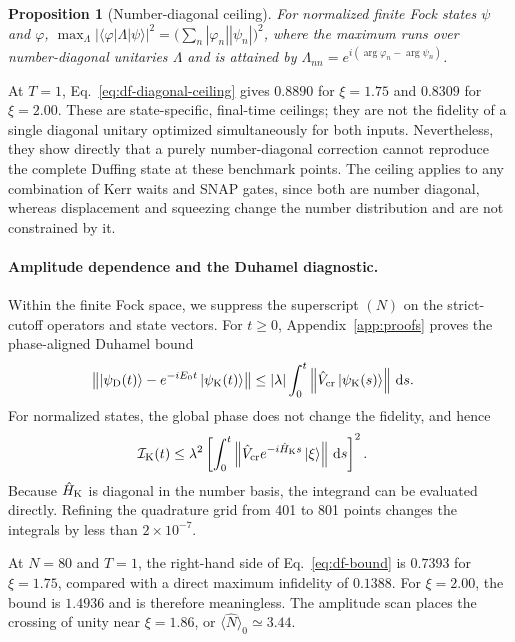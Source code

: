 \documentclass[pra,twocolumn,superscriptaddress,nofootinbib,floatfix]{revtex4-2}
\newtheorem{proposition}{Proposition}
\theoremstyle{remark}
\begin{document}
\begin{proposition}[Number-diagonal ceiling]
\label{prop:diagonal}
For normalized finite Fock states \(\psi\) and \(\varphi\), \(\max_{\Lambda}|\langle\varphi|\Lambda|\psi\rangle|^2=\bigl(\sum_n|\varphi_n||\psi_n|\bigr)^2\), where the maximum runs over number-diagonal unitaries \(\Lambda\) and is attained by \(\Lambda_{nn}=e^{i(\arg\varphi_n-\arg\psi_n)}\).
\end{proposition}

At \(T=1\), Eq.~\eqref{eq:df-diagonal-ceiling} gives \(0.8890\) for \(\xi=1.75\) and \(0.8309\) for \(\xi=2.00\). These are state-specific, final-time ceilings; they are not the fidelity of a single diagonal unitary optimized simultaneously for both inputs. Nevertheless, they show directly that a purely number-diagonal correction cannot reproduce the complete Duffing state at these benchmark points. The ceiling applies to any combination of Kerr waits and SNAP gates, since both are number diagonal, whereas displacement and squeezing change the number distribution and are not constrained by it.

\paragraph{Amplitude dependence and the Duhamel diagnostic.}
Within the finite Fock space, we suppress the superscript \((N)\) on the strict-cutoff operators and state vectors. For \(t\geq0\), Appendix~\ref{app:proofs} proves the phase-aligned Duhamel bound
\begin{align}
\left\|\ket{\psi_{\rm D}(t)}-e^{-iE_0t}\ket{\psi_{\rm K}(t)}\right\| &\leq |\lambda|\int_0^t\left\|\hat V_{\rm cr}\ket{\psi_{\rm K}(s)}\right\|\,{\rm d}s .
\label{eq:df-duhamel}
\end{align}
For normalized states, the global phase does not change the fidelity, and hence
\begin{align}
\mathcal I_{\rm K}(t) &\leq \lambda^2\left[\int_0^t\left\|\hat V_{\rm cr}e^{-i\hat H_{\rm K}s}\ket{\xi}\right\|\,{\rm d}s\right]^2 .
\label{eq:df-bound}
\end{align}
Because \(\hat H_{\rm K}\) is diagonal in the number basis, the integrand can be evaluated directly. Refining the quadrature grid from 401 to 801 points changes the integrals by less than \(2\times10^{-7}\).

At \(N=80\) and \(T=1\), the right-hand side of Eq.~\eqref{eq:df-bound} is \(0.7393\) for \(\xi=1.75\), compared with a direct maximum infidelity of \(0.1388\). For \(\xi=2.00\), the bound is \(1.4936\) and is therefore meaningless. The amplitude scan places the crossing of unity near \(\xi=1.86\), or \(\langle\hat N\rangle_0\simeq3.44\).
\end{document}
